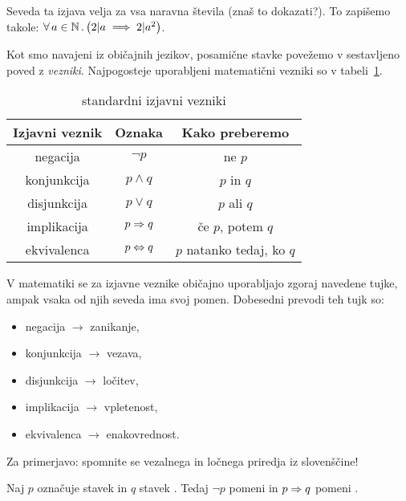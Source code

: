 		Seveda ta izjava velja za vsa naravna števila (znaš to dokazati?). To zapišemo takole: $\all{a}[\NN]{2 | a \implies 2 | a^2}$.
		
		Kot smo navajeni iz običajnih jezikov, posamične stavke povežemo v sestavljeno poved z \emph{vezniki}. Najpogosteje uporabljeni matematični vezniki so v tabeli~\ref{TABELA: standardni izjavni vezniki}.
		
		\begin{table}[!ht]
			\centering
			\begin{tabular}{|ccc|}
				\hline
				\textbf{Izjavni veznik} & \textbf{Oznaka} & \textbf{Kako preberemo} \\
				\hline
				negacija & $\lnot{p}$ & ne $p$ \\
				konjunkcija & $p \land q$ & $p$ in $q$ \\
				disjunkcija & $p \lor q$ & $p$ ali $q$ \\
				implikacija & $p \Rightarrow q$ & če $p$, potem $q$ \\
				ekvivalenca & $p \Leftrightarrow q$ & $p$ natanko tedaj, ko $q$ \\
				\hline
			\end{tabular}
			\caption{standardni izjavni vezniki}\label{TABELA: standardni izjavni vezniki}
		\end{table}
		
		\begin{opomba}
			V matematiki se za izjavne veznike običajno uporabljajo zgoraj navedene tujke, ampak vsaka od njih seveda ima svoj pomen. Dobesedni prevodi teh tujk so:
			\begin{itemize}
				\item
					negacija $\to$ zanikanje,
				\item
					konjunkcija $\to$ vezava,
				\item
					disjunkcija $\to$ ločitev,
				\item
					implikacija $\to$ vpletenost,
				\item
					ekvivalenca $\to$ enakovrednost.
			\end{itemize}
			Za primerjavo: spomnite se vezalnega in ločnega priredja iz slovenščine!
		\end{opomba}
		
		\begin{zgled}
			Naj $p$ označuje stavek  in $q$ stavek . Tedaj $\lnot{p}$ pomeni  in $p \Rightarrow q$ pomeni .
		\end{zgled}
		

